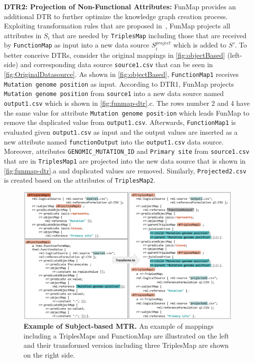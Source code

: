 \noindent\textbf{DTR2: Projection of Non-Functional Attributes:}
FunMap provides an additional DTR to further optimize the knowledge graph creation process. Exploiting transformation rules that are proposed in~\citep{jozashoori2019mapsdi}, FunMap projects all attributes in $S_i$ that are needed by \verb|TriplesMap| including those that are received by \verb|FunctionMap| as input into a new data source $S_i^{project}$ which is added to $S'$. 
To better conceive DTRs, consider the original mappings in \autoref{fig:objectBased} (left-side) and corresponding data source \verb|source1.csv| that can be seen in \autoref{fig:OriginalDatasource}. As shown in \autoref{fig:objectBased}, \verb|FunctionMap1| receives \verb|Mutation genome position| as input. According to DTR1, FunMap projects \verb|Mutation genome position| from \verb|source1| into a new data source named \verb|output1.csv| which is shown in \autoref{fig:funmap-dtr}.c. The rows number 2 and 4 have the same value for attribute \verb|Mutation genome posit|-\verb|ion| which leads FunMap to remove the duplicated value from \verb|output1.csv|. Afterwards, \verb|FunctionMap1| is evaluated given \verb|output1.csv| as input and the output values are inserted as a new attribute named \verb|functionOutput| into the \verb|output1.csv| data source. Moreover, attributes \verb|GENOMIC_MUTATION_ID| and \verb|Primary site| from \verb|source1.csv| that are in \verb|TriplesMap1| are projected into the new data source that is shown in \autoref{fig:funmap-dtr}.a and duplicated values are removed. Similarly, \verb|Projected2.csv| is created based on the attributes of \verb|TriplesMap2|.
\begin{figure}[t!]
\includegraphics[width=\textwidth]{figures/MTR_subjectBased.png}
\caption[Example of Subject-based MTR]{\textbf{Example of Subject-based MTR.} An example of mappings including a TriplesMaps and FunctionMap are illustrated on the left and their transformed version including three TriplesMap are shown on the right side.} 
\label{fig:subjectBased}
\end{figure}
